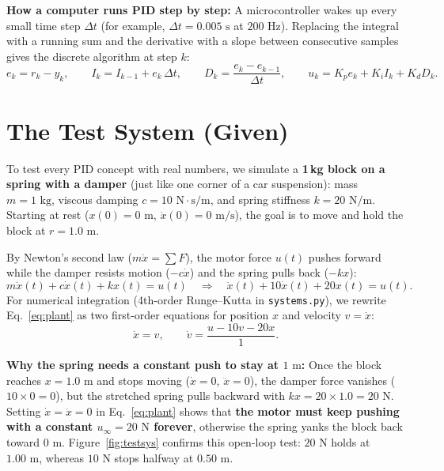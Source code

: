 \documentclass[10pt,a4paper]{article}
\begin{document}
\textbf{How a computer runs PID step by step:} A microcontroller wakes up every small time step $\Delta t$ (for example, $\Delta t = 0.005\text{ s}$ at $200\text{ Hz}$). Replacing the integral with a running sum and the derivative with a slope between consecutive samples gives the discrete algorithm at step $k$:
\begin{equation}
  e_k = r_k - y_k, \qquad
  I_k = I_{k-1} + e_k\,\Delta t, \qquad
  D_k = \frac{e_k - e_{k-1}}{\Delta t}, \qquad
  u_k = K_p e_k + K_i I_k + K_d D_k.
  \label{eq:pid_disc}
\end{equation}

\section{The Test System (Given)}
To test every PID concept with real numbers, we simulate a \textbf{1\,kg block on a spring with a damper} (just like one corner of a car suspension): mass $m = 1\text{ kg}$, viscous damping $c = 10\text{ N}\cdot\text{s/m}$, and spring stiffness $k = 20\text{ N/m}$. Starting at rest ($x(0)=0\text{ m}$, $\dot{x}(0)=0\text{ m/s}$), the goal is to move and hold the block at $r = 1.0\text{ m}$.

By Newton's second law ($m\ddot{x} = \sum F$), the motor force $u(t)$ pushes forward while the damper resists motion ($-c\dot{x}$) and the spring pulls back ($-kx$):
\begin{equation}
  m\ddot{x}(t) + c\dot{x}(t) + kx(t) = u(t)
  \quad\Longrightarrow\quad
  \ddot{x}(t) + 10\dot{x}(t) + 20x(t) = u(t).
  \label{eq:plant}
\end{equation}
For numerical integration (4th-order Runge--Kutta in \texttt{systems.py}), we rewrite Eq.~\eqref{eq:plant} as two first-order equations for position $x$ and velocity $v = \dot{x}$:
\[
  \dot{x} = v, \qquad \dot{v} = \frac{u - 10v - 20x}{1}.
\]

\textbf{Why the spring needs a constant push to stay at $1\text{ m}$:} Once the block reaches $x = 1.0\text{ m}$ and stops moving ($\dot{x}=0$, $\ddot{x}=0$), the damper force vanishes ($10\times 0 = 0$), but the stretched spring pulls backward with $k x = 20 \times 1.0 = 20\text{ N}$. Setting $\dot{x}=\ddot{x}=0$ in Eq.~\eqref{eq:plant} shows that \textbf{the motor must keep pushing with a constant $u_{\infty} = 20\text{ N}$ forever}, otherwise the spring yanks the block back toward $0\text{ m}$. Figure~\ref{fig:testsys} confirms this open-loop test: $20\text{ N}$ holds at $1.00\text{ m}$, whereas $10\text{ N}$ stops halfway at $0.50\text{ m}$.
\end{document}
